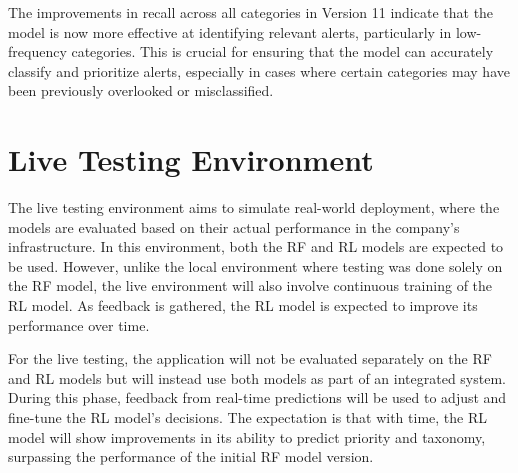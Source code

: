 The improvements in recall across all categories in Version 11 indicate that the model is now more effective at identifying relevant alerts, particularly in low-frequency categories.
This is crucial for ensuring that the model can accurately classify and prioritize alerts, especially in cases where certain categories may have been previously overlooked or misclassified.

\section{Live Testing Environment}

The live testing environment aims to simulate real-world deployment, where the models are evaluated based on their actual performance in the company's infrastructure. 
In this environment, both the RF and RL models are expected to be used. 
However, unlike the local environment where testing was done solely on the RF model, the live environment will also involve continuous training of the RL model. 
As feedback is gathered, the RL model is expected to improve its performance over time.

For the live testing, the application will not be evaluated separately on the RF and RL models but will instead use both models as part of an integrated system. 
During this phase, feedback from real-time predictions will be used to adjust and fine-tune the RL model's decisions. 
The expectation is that with time, the RL model will show improvements in its ability to predict priority and taxonomy, surpassing the performance of the initial RF model version.
